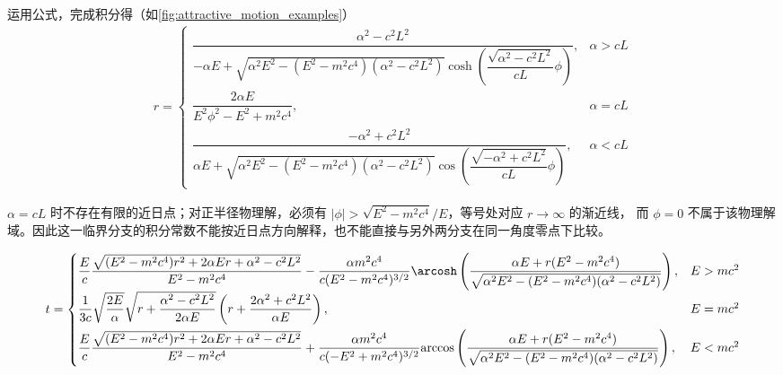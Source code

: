 运用公式，完成积分得（如\cref{fig:attractive_motion_examples}）
\begin{align*}
	r =
	\begin{cases}
		\dfrac{\alpha^2 - c^2 L^2}{-\alpha E + \sqrt{\alpha^2 E^2 - (E^2 - m^2 c^4) (\alpha^2 - c^2 L^2)} \cosh \left( \dfrac{\sqrt{\alpha^2 - c^2 L^2}}{c L} \phi \right)}, & \alpha > c L \\
		\dfrac{2 \alpha E}{E^2 \phi^2 - E^2 + m^2 c^4},                                                                                                                      & \alpha = c L \\
		\dfrac{-\alpha^2 + c^2 L^2}{\alpha E + \sqrt{\alpha^2 E^2 - (E^2 - m^2 c^4) (\alpha^2 - c^2 L^2)} \cos \left( \dfrac{\sqrt{-\alpha^2 + c^2 L^2}}{c L} \phi \right)}, & \alpha < c L
	\end{cases}
\end{align*}
\begin{note}
	\(\alpha=cL\) 时不存在有限的近日点；对正半径物理解，必须有
	\(\lvert\phi\rvert > \sqrt{E^2-m^2c^4}/E\)，等号处对应 \(r\to\infty\) 的渐近线，
	而 \(\phi=0\) 不属于该物理解域。因此这一临界分支的积分常数不能按近日点方向解释，也不能直接与另外两分支在同一角度零点下比较。
\end{note}

{\small
\begin{equation*}
		\begin{split}
			t =
			\begin{cases}
				\dfrac{E}{c} \dfrac{\sqrt{(E^2 - m^2 c^4) r^2 + 2 \alpha E r + \alpha^2 - c^2 L^2}}{E^2 - m^2 c^4}  - \dfrac{\alpha m^2 c^4}{c (E^2 - m^2 c^4)^{3/2}} \arcosh \left( \dfrac{\alpha E + r (E^2 - m^2 c^4)}{\sqrt{\alpha^2 E^2 - (E^2 - m^2 c^4) (\alpha^2 - c^2 L^2)}} \right),        & E > m c^2 \\[9pt]
				\dfrac{1}{3 c} \sqrt{\dfrac{2 E}{\alpha}} \sqrt{r + \dfrac{\alpha^2 - c^2 L^2}{2 \alpha E}} \left( r + \dfrac{2 \alpha^2 + c^2 L^2}{\alpha E} \right),                                                                                                                                & E = m c^2 \\[9pt]
				\dfrac{E}{c} \dfrac{\sqrt{(E^2 - m^2 c^4) r^2 + 2 \alpha E r + \alpha^2 - c^2 L^2}}{E^2 - m^2 c^4}  + \dfrac{\alpha m^2 c^4}{c (-E^2 + m^2 c^4)^{3/2}} \text{arccos} \left( \dfrac{\alpha E + r (E^2 - m^2 c^4)}{\sqrt{\alpha^2 E^2 - (E^2 - m^2 c^4) (\alpha^2 - c^2 L^2)}} \right), & E < m c^2
			\end{cases}
		\end{split}
\end{equation*}
}


